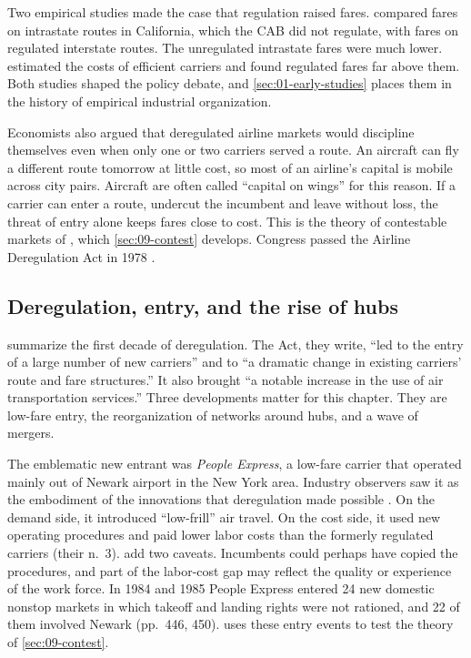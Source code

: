 Two empirical studies made the case that regulation raised fares. \citet{Levine1965} compared fares on
intrastate routes in California, which the CAB did not regulate, with fares on regulated interstate routes.
The unregulated intrastate fares were much lower. \citet{Keeler1972} estimated the costs of efficient
carriers and found regulated fares far above them. Both studies shaped the policy debate, and
\cref{sec:01-early-studies} places them in the history of empirical industrial organization.

Economists also argued that deregulated airline markets would discipline themselves even when only one or two
carriers served a route. An aircraft can fly a different route tomorrow at little cost, so most of an
airline's capital is mobile across city pairs. Aircraft are often called ``capital on wings'' for this
reason. If a carrier can enter a route, undercut the incumbent and leave without loss, the threat of entry
alone keeps fares close to cost. This is the theory of contestable markets of \citet{BaumolPanzarWillig1982},
which \cref{sec:09-contest} develops. Congress passed the Airline Deregulation Act in 1978
\citep[p.~445]{WhinstonCollins1992}.

\subsection{Deregulation, entry, and the rise of hubs}\label{sec:09-hubs}

\citet[p.~445]{WhinstonCollins1992} summarize the first decade of deregulation. The Act, they write, ``led to
the entry of a large number of new carriers'' and to ``a dramatic change in existing carriers' route and fare
structures.'' It also brought ``a notable increase in the use of air transportation services.'' Three
developments matter for this chapter.
They are low-fare entry, the reorganization of networks around hubs, and a wave of mergers.

The emblematic new entrant was \emph{People Express}, a low-fare carrier that operated mainly out of Newark
airport in the New York area. Industry observers saw it as the embodiment of the innovations that
deregulation made possible \citep[pp.~446--447]{WhinstonCollins1992}. On the demand side, it introduced
``low-frill'' air travel. On the cost side, it used new operating procedures and paid lower labor costs than
the formerly regulated carriers (their n.~3). \citeauthor{WhinstonCollins1992} add two caveats. Incumbents
could perhaps have copied the procedures, and part of the labor-cost gap may reflect the quality or experience
of the work force. In 1984 and 1985 People Express entered 24 new domestic nonstop markets in which takeoff
and landing rights were not rationed, and 22 of them involved Newark (pp.~446, 450).  uses
these entry events to test the theory of \cref{sec:09-contest}.

